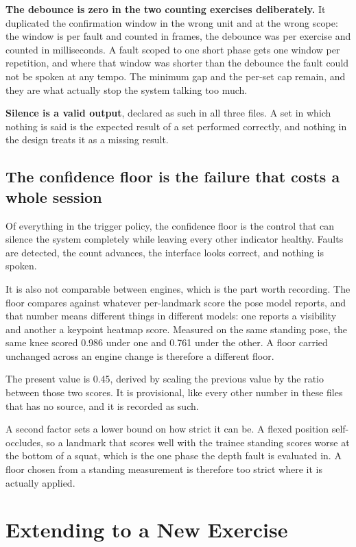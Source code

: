 \textbf{The debounce is zero in the two counting exercises deliberately.} It duplicated the confirmation window in the wrong unit and at the wrong scope: the window is per fault and counted in frames, the debounce was per exercise and counted in milliseconds. A fault scoped to one short phase gets one window per repetition, and where that window was shorter than the debounce the fault could not be spoken at any tempo. The minimum gap and the per-set cap remain, and they are what actually stop the system talking too much.

\textbf{Silence is a valid output}, declared as such in all three files. A set in which nothing is said is the expected result of a set performed correctly, and nothing in the design treats it as a missing result.

\subsection{The confidence floor is the failure that costs a whole session}
\label{sec:6.5.1}

Of everything in the trigger policy, the confidence floor is the control that can silence the system completely while leaving every other indicator healthy. Faults are detected, the count advances, the interface looks correct, and nothing is spoken.

It is also not comparable between engines, which is the part worth recording. The floor compares against whatever per-landmark score the pose model reports, and that number means different things in different models: one reports a visibility and another a keypoint heatmap score. Measured on the same standing pose, the same knee scored 0.986 under one and 0.761 under the other. A floor carried unchanged across an engine change is therefore a different floor.

The present value is 0.45, derived by scaling the previous value by the ratio between those two scores. It is provisional, like every other number in these files that has no source, and it is recorded as such.

A second factor sets a lower bound on how strict it can be. A flexed position self-occludes, so a landmark that scores well with the trainee standing scores worse at the bottom of a squat, which is the one phase the depth fault is evaluated in. A floor chosen from a standing measurement is therefore too strict where it is actually applied.

\section{Extending to a New Exercise}
\label{sec:6.6}

